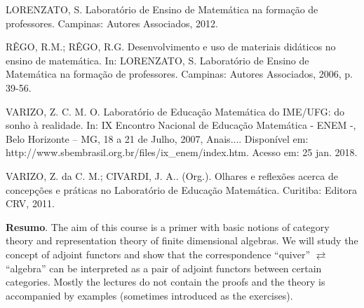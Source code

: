 	
	\begin{thebibliography}{999}
		\bibitem{} LORENZATO, S. Laboratório de Ensino de Matemática na formação de professores. Campinas: Autores Associados, 2012.
		
		\bibitem{} RÊGO, R.M.; RÊGO, R.G. Desenvolvimento e uso de materiais didáticos no ensino de matemática. In: LORENZATO, S. Laboratório de Ensino de Matemática na formação de professores. Campinas: Autores Associados, 2006, p. 39-56.
		
		\bibitem{} VARIZO, Z. C. M. O. Laboratório de Educação Matemática do IME/UFG: do sonho à realidade. In: IX Encontro Nacional de Educação Matemática - ENEM -, Belo Horizonte – MG, 18 a 21 de Julho, 2007, Anais.... Disponível em: http://www.sbembrasil.org.br/files/ix\_enem/index.htm. Acesso em: 25 jan. 2018.
		
		\bibitem{} VARIZO, Z. da C. M.; CIVARDI, J. A.. (Org.). Olhares e reflexões acerca de concepções e práticas no Laboratório de Educação Matemática. Curitiba: Editora CRV, 2011. 
	\end{thebibliography}
		
		\vspace{24pt}

	
	
	\noindent\textbf{Resumo}.\label{Autor} 
	The aim of this course is a primer with basic notions of category theory and representation theory of finite dimensional algebras. We will study the concept of adjoint functors and show that the correspondence “quiver” $\rightleftarrows$ “algebra” can be interpreted as a pair of adjoint functors between certain categories. Mostly the lectures do not contain the proofs and the theory is accompanied by examples (sometimes introduced as the exercises).  
	
